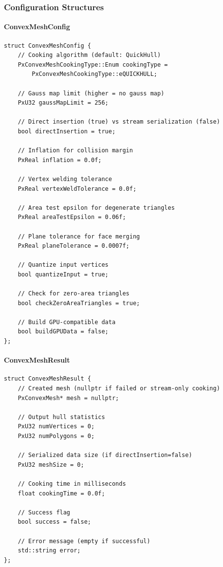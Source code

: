 \subsubsection{Configuration Structures}

\paragraph{ConvexMeshConfig}

\begin{lstlisting}[caption={ConvexMeshConfig structure}]
struct ConvexMeshConfig {
    // Cooking algorithm (default: QuickHull)
    PxConvexMeshCookingType::Enum cookingType =
        PxConvexMeshCookingType::eQUICKHULL;

    // Gauss map limit (higher = no gauss map)
    PxU32 gaussMapLimit = 256;

    // Direct insertion (true) vs stream serialization (false)
    bool directInsertion = true;

    // Inflation for collision margin
    PxReal inflation = 0.0f;

    // Vertex welding tolerance
    PxReal vertexWeldTolerance = 0.0f;

    // Area test epsilon for degenerate triangles
    PxReal areaTestEpsilon = 0.06f;

    // Plane tolerance for face merging
    PxReal planeTolerance = 0.0007f;

    // Quantize input vertices
    bool quantizeInput = true;

    // Check for zero-area triangles
    bool checkZeroAreaTriangles = true;

    // Build GPU-compatible data
    bool buildGPUData = false;
};
\end{lstlisting}

\paragraph{ConvexMeshResult}

\begin{lstlisting}[caption={ConvexMeshResult structure}]
struct ConvexMeshResult {
    // Created mesh (nullptr if failed or stream-only cooking)
    PxConvexMesh* mesh = nullptr;

    // Output hull statistics
    PxU32 numVertices = 0;
    PxU32 numPolygons = 0;

    // Serialized data size (if directInsertion=false)
    PxU32 meshSize = 0;

    // Cooking time in milliseconds
    float cookingTime = 0.0f;

    // Success flag
    bool success = false;

    // Error message (empty if successful)
    std::string error;
};
\end{lstlisting}

